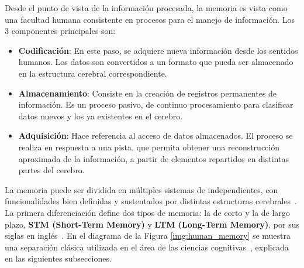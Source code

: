 Desde el punto de vista de la información procesada, la memoria es vista como una facultad humana consistente en procesos para el manejo de información. Los 3 componentes principales son:

\begin{itemize}[topsep=0pt]
	\setlength\itemsep{0.2em}
	\item \textbf{Codificación}: En este paso, se adquiere nueva información desde los sentidos humanos. Los datos son convertidos a un formato que pueda ser almacenado en la estructura cerebral correspondiente.
	\item \textbf{Almacenamiento}: Consiste en la creación de registros permanentes de información. Es un proceso pasivo, de continuo procesamiento para clasificar datos nuevos y los ya existentes en el cerebro.
	\item \textbf{Adquisición}: Hace referencia al acceso de datos almacenados. El proceso se realiza en respuesta a una pista, que permita obtener una reconstrucción aproximada de la información, a partir de elementos repartidos en distintas partes del cerebro.
\end{itemize}

La memoria puede ser dividida en múltiples sistemas de independientes, con funcionalidades bien definidas y sustentados por distintas estructuras cerebrales~\cite{pmid-Squire}. La primera diferenciación define dos tipos de memoria: la de corto y la de largo plazo, \textbf{STM (Short-Term Memory)} y \textbf{LTM (Long-Term Memory)}, por sus siglas en inglés~\cite{pmid10643472}. En el diagrama de la Figura \ref{img:human_memory} se muestra una separación clásica utilizada en el área de las ciencias cognitivas~\cite{Eichenbaum:2008}, explicada en las siguientes subsecciones.

\usetikzlibrary{arrows,shapes,positioning,shadows,trees}

